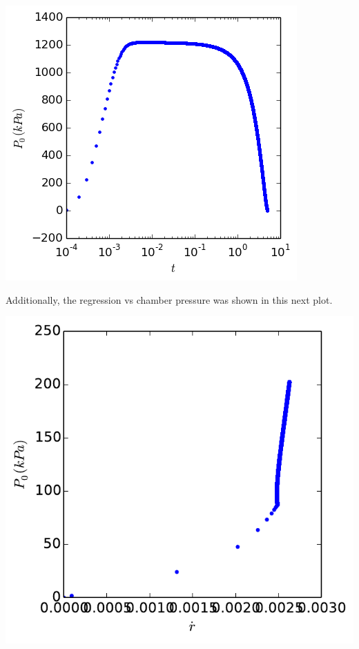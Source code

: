 \documentclass[cleanfoot,cleanhead,twocolumn,10pt,notitlepage]{asme2e}
\begin{document}
\includegraphics[width=\linewidth]{../python_stuff/Part2_flameTemp/P0.png}

Additionally, the regression vs chamber pressure was shown in this next plot.

\includegraphics[width=\linewidth]{../python_stuff/Part1/Reg_v_P0.pdf}
\end{document}
